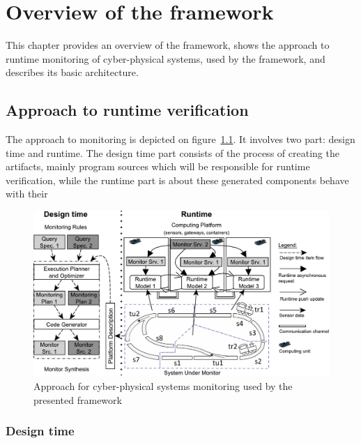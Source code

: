 
\chapter{Overview of the framework}


This chapter provides an overview of the framework, shows the approach to runtime monitoring of cyber-physical systems, used by the framework, and describes its basic architecture.

\section{Approach to runtime verification}

The approach to monitoring is depicted on figure~\ref{fig:approach}. 
It involves two part: design time and runtime.
The design time part consists of the process of creating the artifacts, mainly program sources which will be responsible for runtime verification, 
while the runtime part is about these generated components behave with their 

\begin{figure}[h]
	\begin{center}
		\includegraphics[width=\textwidth]{figures/fase-overview-crop.pdf}
		\caption{Approach for cyber-physical systems monitoring used by the presented framework }
		\label{fig:approach}
	\end{center}
\end{figure}

\subsection{Design time}

